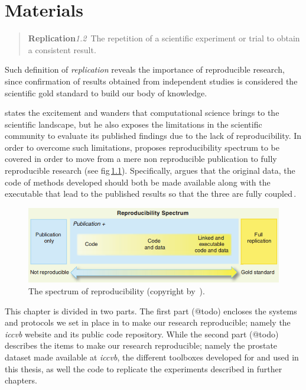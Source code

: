 \graphicspath{{4_materials/figures/}}
\chapter{Materials}\label{chap:4}

\begin{quote}
  \textbf{Replication}\quad \emph{1.2}~The repetition of a scientific
  experiment or trial to obtain a consistent result.
\end{quote}

Such definition of \emph{replication} reveals the importance of reproducible
research, since confirmation of results obtained from independent studies is
considered the scientific gold standard to build our body of knowledge.

\citeauthor{peng2011reproducible} states the excitement and wanders that
computational science brings to the scientific landscape, but he also exposes
the limitations in the scientific community to evaluate its published findings
due to the lack of reproducibility. In order to overcome such limitations,
\citeauthor{peng2011reproducible} proposes reproducibility spectrum to be
covered in order to move from a mere non reproducible publication to fully
reproducible research (see \acs{fig}\,\ref{fig:reproducibility_spectrum}).
Specifically, \citeauthor{peng2011reproducible} argues that the original data,
the code of methods developed should both be made available along with the
executable that lead to the published results so that the three are fully
coupled\,\cite{peng2011reproducible}.

\begin{figure}
\centering
\includegraphics[width=.50\textwidth]{reproducibility_spectrum}
\caption[The spectrum of reproducibility.]{The spectrum of reproducibility (copyright by~\cite{peng2011reproducible}).}
\label{fig:reproducibility_spectrum}
\end{figure}



This chapter is divided in two parts. The first part (@todo) encloses the
systems and protocols we set in place in to make our research reproducible;
namely the \emph{iccvb} website and its public code repository. 
While the second part (@todo) describes the items to make our research
reproducible; namely the prostate dataset made available at \emph{iccvb},
the different toolboxes developed for and used in this thesis, as well the code
to replicate the experiments described in further chapters.

